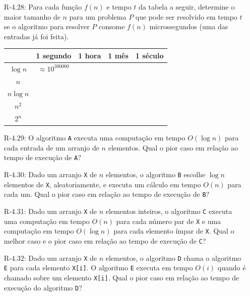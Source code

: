 \begin{enumerate}
\begin{itemize}
		\item[R-4.28:] Para cada função $f(n)$ e tempo $t$ da tabela a seguir, determine o maior tamanho de $n$ para um problema $P$ que pode ser resolvido em tempo $t$ se o algoritmo para resolver $P$ consome $f(n)$ microssegundos (uma das entradas já foi feita).
		
		\begin{table}[H]
			\centering
			\begin{tabular}{|c|c|c|c|c|}
				\hline\hline
				           &       1 segundo        & 1 hora & 1 mês & 1 século \\ \hline
				 $\log n$  & $\approx 10 ^{300000}$ &        &       &  \\ \hline
				   $n$     &                        &        &       &  \\ \hline
				$n \log n$ &                        &        &       &  \\ \hline
				  $n^2$    &                        &        &       &  \\ \hline
				  $2^n$    &                        &        &       &  \\ \hline\hline
			\end{tabular} 
		\end{table}
		
		\item[R-4.29:] O algoritmo \texttt{A} executa uma computação em tempo $O(\log n)$ para cada entrada de um arranjo de $n$ elementos. Qual o pior caso em relação ao tempo de execução de \texttt{A}?
		
		\item[R-4.30:] Dado um arranjo \texttt{X} de $n$ elementos, o algoritmo \texttt{B} escolhe $\log n$ elementos de \texttt{X}, aleatoriamente, e executa um cálculo em tempo $O(n)$ para cada um. Qual o pior caso em relação ao tempo de execução de \texttt{B}?
		
		\item[R-4.31:] Dado um arranjo \texttt{X} de $n$ elementos inteiros, o algoritmo \texttt{C} executa uma computação em tempo $O(n)$ para cada número par de \texttt{X} e uma computação em tempo $O(\log n)$ para cada elemento ímpar de \texttt{X}. Qual o melhor caso e o pior caso em relação ao tempo de execução de \texttt{C}?
		
		\item[R-4.32:] Dado um arranjo \texttt{X} de $n$ elementos, o algoritmo \texttt{D} chama o algoritmo \texttt{E} para cada elemento \texttt{X[i]}. O algoritmo \texttt{E} executa em tempo $O(i)$ quando é chamado sobre um elemento \texttt{X[i]}. Qual o pior caso em relação ao tempo de execução do algoritmo \texttt{D}?
	

\end{itemize}
\end{enumerate}
